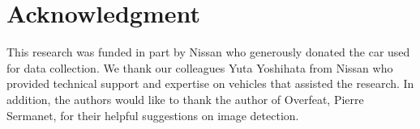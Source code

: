 \documentclass[journal]{IEEEtran}
\begin{document}

%



\section*{Acknowledgment}

This research was funded in part by Nissan who generously donated the car used for data collection. We thank our colleagues Yuta Yoshihata from Nissan who provided technical support and expertise on vehicles that assisted the research. In addition, the authors would like to thank the author of Overfeat, Pierre Sermanet, for their helpful suggestions on image detection.





\end{document}
